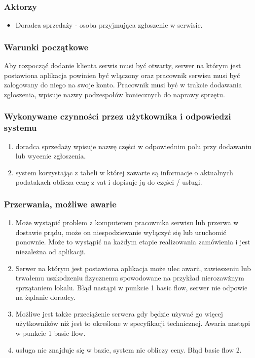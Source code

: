 \documentclass{article}
\begin{document}
\subsubsection{Aktorzy}
\begin{itemize}
    \item Doradca sprzedaży - osoba przyjmująca zgłoszenie w serwisie.
\end{itemize}
\subsubsection{Warunki początkowe}
Aby rozpocząć dodanie klienta serwis musi być otwarty, serwer na którym jest postawiona aplikacja powinien być włączony oraz pracownik serwisu musi być zalogowany do niego
na swoje konto. Pracownik musi być w trakcie dodawania zgłoszenia, wpisuje nazwy podzespołów koniecznych do naprawy sprzętu.
\subsubsection{Wykonywane czynności przez użytkownika i odpowiedzi systemu}
\begin{enumerate}
    \item doradca sprzedaży wpisuje nazwę części w odpowiednim polu przy dodawaniu lub wycenie zgłoszenia.
    \item system korzystając z tabeli w której zawarte są informacje o aktualnych podatakach oblicza cenę z vat i dopisuje ją do części / usługi.
\end{enumerate}
\subsubsection{Przerwania, możliwe awarie}
\begin{enumerate}
    \item Może wystąpić problem z komputerem pracownika serwisu lub przerwa w dostawie prądu, może on niespodziewanie wyłączyć się lub uruchomić ponownie. Może to wystąpić na każdym etapie realizowania zamówienia i jest niezależna od aplikacji.
    \item Serwer na którym jest postawiona aplikacja może ulec awarii, zawieszeniu lub trwałemu uszkodzeniu fizycznemu spowodowane na przykład nierozawżnym sprzątaniem lokalu. Błąd nastąpi w punkcie 1 basic flow, serwer nie odpowie na żądanie doradcy.
    \item Możliwe jest także przeciążenie serwera gdy będzie używać go więcej użytkowników niż jest to określone w specyfikacji technicznej. Awaria nastąpi w punkcie 1 basic flow.
    \item usługa nie znajduje się w bazie, system nie obliczy ceny. Błąd basic flow 2.
\end{enumerate}
\end{document}
